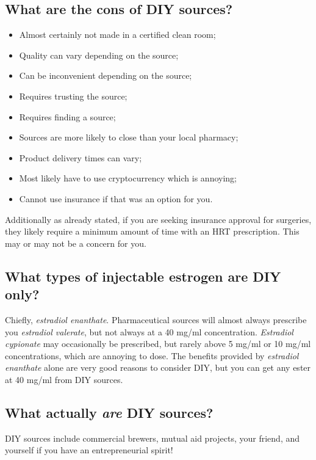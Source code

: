 \documentclass{article}
\begin{document}
\subsection{What are the cons of DIY sources?}

\begin{itemize}
  \item Almost certainly not made in a certified clean room;
  \item Quality can vary depending on the source;
  \item Can be inconvenient depending on the source;
  \item Requires trusting the source;
  \item Requires finding a source;
  \item Sources are more likely to close than your local pharmacy;
  \item Product delivery times can vary;
  \item Most likely have to use cryptocurrency which is annoying;
  \item Cannot use insurance if that was an option for you.
\end{itemize}
Additionally as already stated, if you are seeking insurance approval for surgeries, they likely require a minimum amount of time with an HRT prescription. This may or may not be a concern for you.

\subsection{What types of injectable estrogen are DIY only?}

Chiefly, \textit{estradiol enanthate}. Pharmaceutical sources will almost always prescribe you \textit{estradiol valerate}, but not always at a 40 mg/ml concentration. \textit{Estradiol cypionate} may occasionally be prescribed, but rarely above 5 mg/ml or 10 mg/ml concentrations, which are annoying to dose. The benefits provided by \textit{estradiol enanthate} alone are very good reasons to consider DIY, but you can get any ester at 40 mg/ml from DIY sources.

\subsection{What actually \textit{are} DIY sources?}

DIY sources include commercial brewers, mutual aid projects, your friend, and yourself if you have an entrepreneurial spirit!
\end{document}
